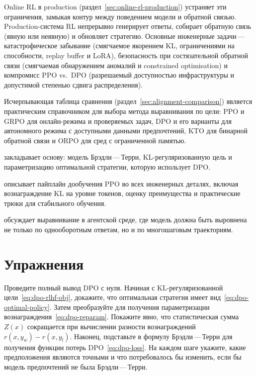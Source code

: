 Online RL в production (раздел~\ref{sec:online-rl-production}) устраняет эти ограничения, замыкая контур между поведением модели и обратной связью. Production-система RL непрерывно генерирует ответы, собирает обратную связь (явную или неявную) и обновляет стратегию. Основные инженерные задачи\,---\,катастрофическое забывание (смягчаемое якорением KL, ограничениями на способности, replay buffer и LoRA), безопасность при состязательной обратной связи (смягчаемая обнаружением аномалий и constrained optimisation) и компромисс PPO vs.\ DPO (разрешаемый доступностью инфраструктуры и допустимой степенью сдвига распределения).

Исчерпывающая таблица сравнения (раздел~\ref{sec:alignment-comparison}) является практическим справочником для выбора метода выравнивания по цели: PPO и GRPO для онлайн-режима и проверяемых задач, DPO и его варианты для автономного режима с доступными данными предпочтений, KTO для бинарной обратной связи и ORPO для сред с ограниченной памятью.

\begin{description}[leftmargin=!,labelwidth=1.5cm]
  \item[Глава~\ref{ch:reward-models}] закладывает основу: модель Брэдли\,---\,Терри, KL-регуляризованную цель и параметризацию оптимальной стратегии, которую использует DPO.
  \item[Глава~\ref{ch:practical-rlhf}] описывает пайплайн дообучения PPO во всех инженерных деталях, включая вознаграждение KL на уровне токенов, оценку преимущества и практические трюки для стабильного обучения.
  \item[Глава~\ref{ch:agents}] обсуждает выравнивание в агентской среде, где модель должна быть выровнена не только по однооборотным ответам, но и по многошаговым траекториям.
\end{description}

\section*{Упражнения}

\begin{exercise}
\label{ex:dpo-derivation}
Проведите полный вывод DPO с нуля. Начиная с KL-регуляризованной цели~\eqref{eq:dpo-rlhf-obj}, докажите, что оптимальная стратегия имеет вид~\eqref{eq:dpo-optimal-policy}. Затем преобразуйте для получения параметризации вознаграждения~\eqref{eq:dpo-reparam}. Покажите явно, что статистическая сумма $Z(x)$ сокращается при вычислении разности вознаграждений $r(x, y_w) - r(x, y_l)$. Наконец, подставьте в формулу Брэдли\,---\,Терри для получения функции потерь DPO~\eqref{eq:dpo-loss}. На каждом шаге укажите, какие предположения являются точными и что потребовалось бы изменить, если бы модель предпочтений не была Брэдли\,---\,Терри.
\end{exercise}


